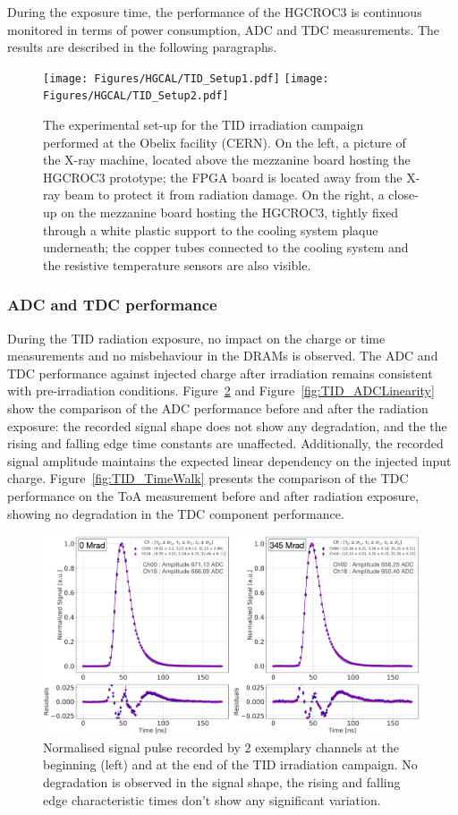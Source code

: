 \bigbreak

During the exposure time, the performance of the HGCROC3 is continuous monitored in terms of power consumption, ADC and TDC measurements. The results are described in the following paragraphs. 

\begin{figure}
    \centering
    \texttt{[image: Figures/HGCAL/TID\_Setup1.pdf]}
    \texttt{[image: Figures/HGCAL/TID\_Setup2.pdf]}
    \caption{The experimental set-up for the TID irradiation campaign performed at the Obelix facility (CERN). On the left, a picture of the X-ray machine, located above the mezzanine board hosting the HGCROC3 prototype; the FPGA board is located away from the X-ray beam to protect it from radiation damage. On the right, a close-up on the mezzanine board hosting the HGCROC3, tightly fixed through a white plastic support to the cooling system plaque underneath; the copper tubes connected to the cooling system and the resistive temperature sensors are also visible.}
    \label{fig:TID_Setup}
\end{figure}

\subsubsection{ADC and TDC performance}
\label{subsubsec:ADC and TDC performance}

During the TID radiation exposure, no impact on the charge or time measurements and no misbehaviour in the DRAMs is observed. The ADC and TDC performance against injected charge after irradiation remains consistent with pre-irradiation conditions.
Figure~\ref{fig:TID_SignalShape} and Figure~\ref{fig:TID_ADCLinearity} show the comparison of the ADC performance before and after the radiation exposure: the recorded signal shape does not show any degradation, and the the rising and falling edge time constants are unaffected. Additionally, the recorded signal amplitude maintains the expected linear dependency on the injected input charge.
Figure~\ref{fig:TID_TimeWalk} presents the comparison of the TDC performance on the ToA measurement before and after radiation exposure, showing no degradation in the TDC component performance.

\begin{figure}
    \centering
    \includegraphics[width=0.7\linewidth]{Figures/HGCAL/TID_SignalShape.pdf}
    \caption{Normalised signal pulse recorded by 2 exemplary channels at the beginning (left) and at the end of the TID irradiation campaign. No degradation is observed in the signal shape, the rising and falling edge characteristic times don't show any significant variation.}
    \label{fig:TID_SignalShape}
\end{figure}

